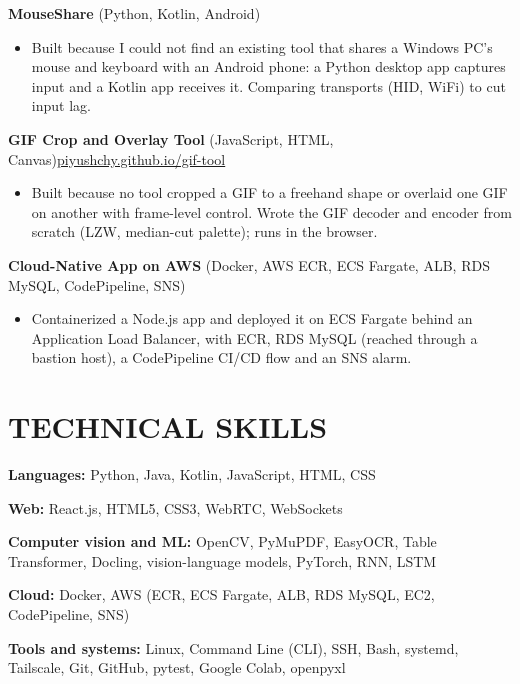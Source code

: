 \documentclass[10pt,letterpaper]{article}
\begin{document}
\vspace{1pt}
\noindent\textbf{MouseShare} (Python, Kotlin, Android)\par
\begin{itemize}
  \item Built because I could not find an existing tool that shares a Windows PC's mouse and keyboard with an Android phone: a Python desktop app captures input and a Kotlin app receives it. Comparing transports (HID, WiFi) to cut input lag.
\end{itemize}

\vspace{1pt}
\noindent\textbf{GIF Crop and Overlay Tool} (JavaScript, HTML, Canvas)\hfill \href{https://piyushchy.github.io/gif-tool/}{piyushchy.github.io/gif-tool}\par
\begin{itemize}
  \item Built because no tool cropped a GIF to a freehand shape or overlaid one GIF on another with frame-level control. Wrote the GIF decoder and encoder from scratch (LZW, median-cut palette); runs in the browser.
\end{itemize}

\vspace{1pt}
\noindent\textbf{Cloud-Native App on AWS} (Docker, AWS ECR, ECS Fargate, ALB, RDS MySQL, CodePipeline, SNS)\par
\begin{itemize}
  \item Containerized a Node.js app and deployed it on ECS Fargate behind an Application Load Balancer, with ECR, RDS MySQL (reached through a bastion host), a CodePipeline CI/CD flow and an SNS alarm.
\end{itemize}

\section*{TECHNICAL SKILLS}
\textbf{Languages:} Python, Java, Kotlin, JavaScript, HTML, CSS\par
\textbf{Web:} React.js, HTML5, CSS3, WebRTC, WebSockets\par
\textbf{Computer vision and ML:} OpenCV, PyMuPDF, EasyOCR, Table Transformer, Docling, vision-language models, PyTorch, RNN, LSTM\par
\textbf{Cloud:} Docker, AWS (ECR, ECS Fargate, ALB, RDS MySQL, EC2, CodePipeline, SNS)\par
\textbf{Tools and systems:} Linux, Command Line (CLI), SSH, Bash, systemd, Tailscale, Git, GitHub, pytest, Google Colab, openpyxl\par
\end{document}
